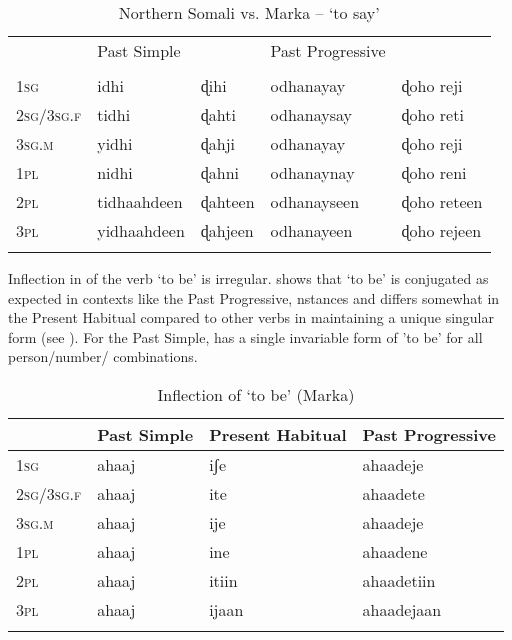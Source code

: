 \documentclass[output=paper,modfonts,nonflat,
colorlinks, citecolor=brown,
draftmode
]{langsci/langscibook}
\begin{document}
 \begin{table}
 	\caption{{Northern Somali vs. Marka -- `to say'}}
 	\label{tab:1:Irregular Verbs}
 	\begin{tabularx}{\textwidth}{Xllll} 
 		\lsptoprule
 		& Past Simple   &   & Past Progressive &    \\
 		& \ilit{Somali} & \ilit{Marka} & \ilit{Somali} & \ilit{Marka} \\ 
 		\midrule
 		1\textsc{sg} & idhi & ɖihi & odhanayay & ɖoho reji \\
 		2\textsc{sg}/3\textsc{sg.f} & tidhi  & ɖahti & odhanaysay  & ɖoho reti  \\
 		3\textsc{sg.m} & yidhi & ɖahji & odhanayay & ɖoho reji \\
 		1\textsc{pl} & nidhi & ɖahni & odhanaynay & ɖoho reni \\
 		2\textsc{pl} & tidhaahdeen & ɖahteen & odhanayseen & ɖoho reteen \\
 		3\textsc{pl} & yidhaahdeen & ɖahjeen & odhanayeen & ɖoho rejeen \\
 		\lspbottomrule
 	\end{tabularx}
 \end{table}
 
 Inflection in  of the verb  `to be' is irregular.  shows that `to be' is conjugated as expected in  contexts like the Past Progressive, nstances and differs somewhat in the Present Habitual compared to other verbs in maintaining a unique  singular  form (see ). For the Past Simple,  has a single invariable form of 'to be' for all person/number/ combinations.
 
  \begin{table}
 	\caption{{Inflection of `to be' (Marka)}}
 	\label{tab:1:ToBe}
 	\begin{tabularx}{\textwidth}{Xlll} 
 		\lsptoprule
 		& Past Simple   &  Present Habitual & Past Progressive    \\  
 		\midrule
 		1\textsc{sg} & ahaaj & iʃe & ahaadeje \\
 		2\textsc{sg}/3\textsc{sg.f} & ahaaj  & ite & ahaadete   \\
 		3\textsc{sg.m} & ahaaj & ije & ahaadeje  \\
 		1\textsc{pl} & ahaaj & ine & ahaadene  \\
 		2\textsc{pl} & ahaaj & itiin & ahaadetiin  \\
 		3\textsc{pl} & ahaaj & ijaan & ahaadejaan \\
 		\lspbottomrule
 	\end{tabularx}
 \end{table}
 
\end{document}
